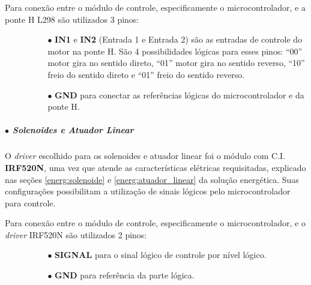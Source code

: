     Para conexão entre o módulo de controle, especificamente o microcontrolador, e a ponte H L298 são utilizados 3 pinos:
    
    \begin{itemize}
        \item[ ]
        \begin{itemize}
            \item[ ]
            \begin{itemize}
                \item[$\bullet$] \textbf{IN1} e \textbf{IN2} (Entrada 1 e Entrada 2) são as entradas de controle do motor na ponte H. São 4 possibilidades lógicas para esses pinos: ``00'' motor gira no sentido direto, ``01'' motor gira no sentido reverso, ``10'' freio do sentido direto e ``01'' freio do sentido reverso.
                \item[$\bullet$] \textbf{GND} para conectar as referências lógicas do microcontrolador e da ponte H.
            \end{itemize}
        \end{itemize}
    \end{itemize}
    
    
    \subparagraph*{$\bullet$ \textbf{Solenoides e Atuador Linear}}
    
    O \textit{driver} escolhido para os solenoides e atuador linear foi o módulo com C.I. \textbf{IRF520N}, uma vez que atende as características elétricas requisitadas, explicado nas seções \ref{energ:solenoide} e \ref{energ:atuador_linear} da solução energética. Suas configurações possibilitam a utilização de sinais lógicos pelo microcontrolador para controle.
    
    Para conexão entre o módulo de controle, especificamente o microcontrolador, e o \textit{driver} IRF520N são utilizados 2 pinos:
    
    \begin{itemize}
        \item[]
        \begin{itemize}
            \item[]
            \begin{itemize}
                \item[$\bullet$] \textbf{SIGNAL} para o sinal lógico de controle por nível lógico.
                \item[$\bullet$] \textbf{GND} para referência da parte lógica.
            \end{itemize}
        \end{itemize}
    \end{itemize}
    

